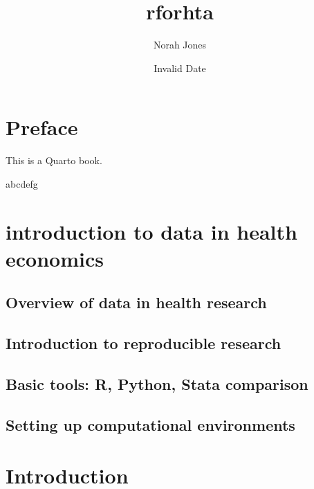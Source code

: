 \documentclass[
  letterpaper,
  DIV=11,
  numbers=noendperiod]{scrreprt}
\title{rforhta}
\author{Norah Jones}
\date{Invalid Date}
\renewcommand*\contentsname{Table of contents}
\newcommand\contentsname{Table of contents}
\begin{document}
\maketitle

\renewcommand*\contentsname{Table of contents}
{
\hypersetup{linkcolor=}
\setcounter{tocdepth}{2}
\tableofcontents
}


\chapter*{Preface}\label{preface}


This is a Quarto book.

abcdefg


\chapter{introduction to data in health
economics}\label{introduction-to-data-in-health-economics}

\section{Overview of data in health
research}\label{overview-of-data-in-health-research}

\section{Introduction to reproducible
research}\label{introduction-to-reproducible-research}

\section{Basic tools: R, Python, Stata
comparison}\label{basic-tools-r-python-stata-comparison}

\section{Setting up computational
environments}\label{setting-up-computational-environments}


\chapter{Introduction}\label{introduction}
\end{document}
